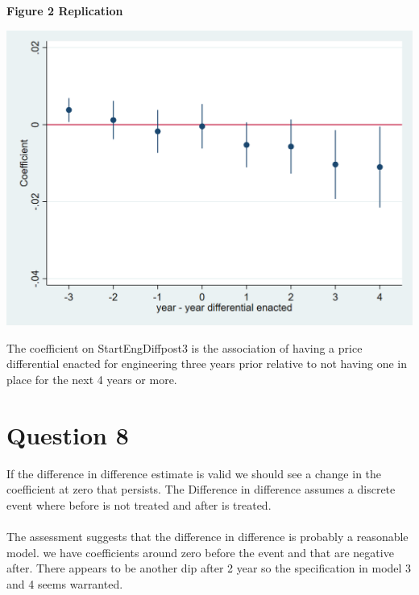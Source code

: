 \documentclass[11pt]{article}
\begin{document}
 \begin{center}
 	
 	\centering
 	\textbf{Figure 2 Replication}\par\medskip
 	\includegraphics[width=1\linewidth]{ps1_figure_eng_share.png}
 \end{center}
 
 The coefficient on StartEngDiffpost3 is the association of having a price differential enacted for engineering three years prior relative to not having one in place for the next 4 years or more. 
 
 
 \section{Question 8}
 
 If the difference in difference estimate is valid we should see a change in the coefficient at zero that persists. The Difference in difference assumes a discrete event where before is not treated and after is treated.
 \\ \\ 
 The assessment suggests that the difference in difference is probably a reasonable model.  we have coefficients around zero before the event and that are negative after. There appears to be another dip after 2 year so the specification in model 3 and 4 seems warranted. 
 
\end{document}
